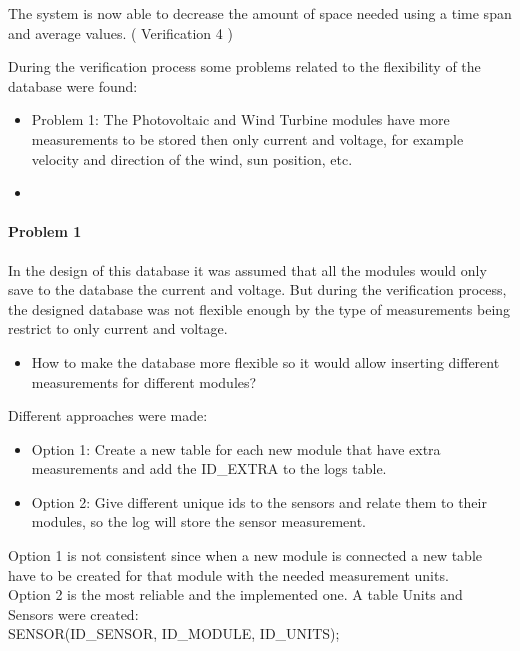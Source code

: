 The system is now able to decrease the amount of space needed using a time span and average values. ( Verification 4 )

During the verification process some problems related to the flexibility of the database were found:
	\begin{itemize}
		\item Problem 1: The Photovoltaic and Wind Turbine modules have more measurements to be stored then only current and voltage, for example velocity and direction of the wind, sun position, etc.
		\item {}
	\end{itemize}

\paragraph{Problem 1}
In the design of this database it was assumed that all the modules would only save to the database the current and voltage. But during the verification process, the designed database was not flexible enough by the type of measurements being restrict to only current and voltage.

	\begin{itemize}
		\item How to make the database more flexible so it would allow inserting different measurements for different modules?
	\end{itemize}

Different approaches were made:
	
	\begin{itemize}
		\item Option 1: Create a new table for each new module that have extra measurements and add the ID\_EXTRA to the logs table.
		\item Option 2: Give different unique ids to the sensors and relate them to their modules, so the log will store the sensor measurement.
	\end{itemize}

Option 1 is not consistent since when a new module is connected a new table have to be created for that module with the needed measurement units.\\
Option 2 is the most reliable and the implemented one. A table Units and Sensors were created:\\

SENSOR(ID\_SENSOR, ID\_MODULE, ID\_UNITS);

